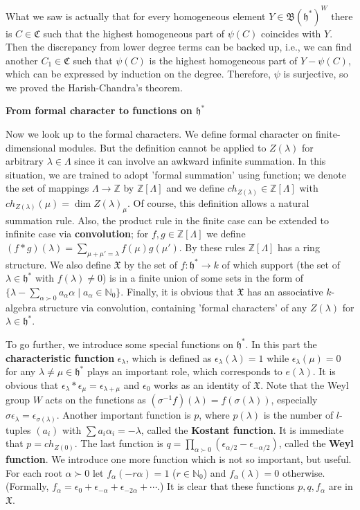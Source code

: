 \documentclass{article}
\newcommand{\NaN}{\mathbb{N}}
\newcommand{\InZ}{\mathbb{Z}}
\newcommand{\SBar}{\;|\;}
\newcommand{\lie}[1]{\mathfrak{#1}}
\begin{document}
What we saw is actually that for every homogeneous element $Y \in \mathfrak{B}(\lie{h}^*)^W$ there is $C \in \mathfrak{C}$ such that the highest homogeneous part of $\psi(C)$ coincides with $Y$.
Then the discrepancy from lower degree terms can be backed up, i.e., we can find another $C_1 \in \mathfrak{C}$ such that $\psi(C)$ is the highest homogeneous part of $Y - \psi(C)$, which can be expressed by induction on the degree.
Therefore, $\psi$ is surjective, so we proved the Harish-Chandra's theorem.

\newpage

\textbf{From formal character to functions on $\lie{h}^*$}

Now we look up to the formal characters.
We define formal character on finite-dimensional modules.
But the definition cannot be applied to $Z(\lambda)$ for arbitrary $\lambda \in \Lambda$ since it can involve an awkward infinite summation.
In this situation, we are trained to adopt 'formal summation' using function; we denote the set of mappings $\Lambda \to \InZ$ by $\InZ[\Lambda]$ and we define $ch_{Z(\lambda)} \in \InZ[\Lambda]$ with $ch_{Z(\lambda)}(\mu) = \dim{Z(\lambda)_\mu}$.
Of course, this definition allows a natural summation rule.
Also, the product rule in the finite case can be extended to infinite case via \textbf{convolution}; for $f, g \in \InZ[\Lambda]$ we define $(f * g)(\lambda) = \sum_{\mu + \mu' = \lambda} f(\mu) g(\mu')$.
By these rules $\InZ[\Lambda]$ has a ring structure.
We also define $\mathfrak{X}$ by the set of $f : \lie{h}^* \to k$ of which support (the set of $\lambda \in \lie{h}^*$ with $f(\lambda) \ne 0$) is in a finite union of some sets in the form of $\{\lambda - \sum_{\alpha \succ 0} a_\alpha \alpha \SBar a_\alpha \in \NaN_0\}$.
Finally, it is obvious that $\mathfrak{X}$ has an associative $k$-algebra structure via convolution, containing 'formal characters' of any $Z(\lambda)$ for $\lambda \in \lie{h}^*$.

To go further, we introduce some special functions on $\lie{h}^*$.
In this part the \textbf{characteristic function} $\epsilon_{\lambda}$, which is defined as $\epsilon_{\lambda}(\lambda) = 1$ while $\epsilon_{\lambda}(\mu) = 0$ for any $\lambda \ne \mu \in \lie{h}^*$ plays an important role, which corresponds to $e(\lambda)$.
It is obvious that $\epsilon_\lambda * \epsilon_\mu = \epsilon_{\lambda + \mu}$ and $\epsilon_0$ works as an identity of $\mathfrak{X}$.
Note that the Weyl group $W$ acts on the functions as $(\sigma^{-1} f)(\lambda) = f(\sigma(\lambda))$, especially $\sigma \epsilon_\lambda = \epsilon_{\sigma(\lambda)}$.
Another important function is $p$, where $p(\lambda)$ is the number of $l$-tuples $(a_i)$ with $\sum a_i \alpha_i = -\lambda$, called the \textbf{Kostant function}.
It is immediate that $p = ch_{Z(0)}$.
The last function is $q = \prod_{\alpha \succ 0} (\epsilon_{\alpha / 2} - \epsilon_{-\alpha / 2})$, called the \textbf{Weyl function}.
We introduce one more function which is not so important, but useful.
For each root $\alpha \succ 0$ let $f_\alpha(-r\alpha) = 1$ ($r \in \NaN_0$) and $f_\alpha(\lambda) = 0$ otherwise.
(Formally, $f_\alpha = \epsilon_0 + \epsilon_{-\alpha} + \epsilon_{-2\alpha} + \cdots$.)
It is clear that these functions $p, q, f_\alpha$ are in $\mathfrak{X}$.
\end{document}
